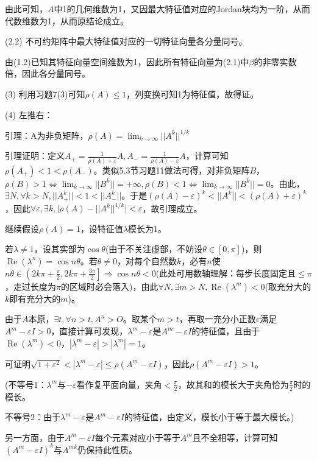\documentclass[a4paper,UTF8,fontset=windows]{ctexart}
\DeclareMathOperator{\re}{Re}
\begin{document}
\begin{enumerate}
由此可知，$A$中1的几何维数为1，又因最大特征值对应的Jordan块均为一阶，从而代数维数为1，从而原结论成立。

(2.2) 不可约矩阵中最大特征值对应的一切特征向量各分量同号。

由(1.2)已知其特征向量空间维数为1，因此所有特征向量为(2.1)中$\beta$的非零实数倍，因此各分量同号。

(3) 利用习题7(3)可知$\rho(A)\le1$，列变换可知1为特征值，故得证。

(4) 左推右：

引理：A为非负矩阵，$\rho(A)=\lim_{k\to\infty}{||A^k||^{1/k}}$

引理证明：定义$A_+=\frac{1}{\rho(A)+\varepsilon}A,A_-=\frac{1}{\rho(A)-\varepsilon}A$，计算可知$\rho(A_+)<1<\rho(A_-)$。类似5.3节习题11做法可得，对非负矩阵$B$，$\rho(B)>1\Leftrightarrow\lim_{k\to\infty}||B^k||=+\infty,\rho(B)<1\Leftrightarrow\lim_{k\to\infty}||B^k||=0$。由此，$\exists N,\forall k>N,||A_+^k||<1<||A_-^k||$。于是$(\rho(A)-\varepsilon)^k<||A^k||<(\rho(A)+\varepsilon)^k$，因此$\forall\varepsilon,\exists k,\big|\rho(A)-||A^k||^{1/k}\big|<\varepsilon$，故引理成立。

继续假设$\rho(A)=1$，设特征值$\lambda$模长为1。

若$\lambda\ne1$，设其实部为$\cos{\theta}$(由于不关注虚部，不妨设$\theta\in[0,\pi]$)，则$\re(\lambda^n)=\cos{n\theta}$。若$\theta\ne0$，对每个自然数$k$，必有$n$使$n\theta\in\left(2k\pi+\frac{\pi}{2},2k\pi+\frac{3\pi}{2}\right]\Rightarrow\cos{n\theta}<0$(此处可用数轴理解：每步长度固定且$\le\pi$，走过长度为$\pi$的区域时必会落入)，由此$\forall N,\exists m>N,\re(\lambda^m)<0$(取充分大的$k$即有充分大的$m$)。

由于$A$本原，$\exists t,\forall n>t,A^n>O$。取某个$m>t$，再取一充分小正数$\varepsilon$满足$A^m-\varepsilon I>0$，直接计算可发现，$\lambda^m-\varepsilon$是$A^m-\varepsilon I$的特征值，且由于$\re(\lambda^m)<0$，$|\lambda^m-\varepsilon|>|\lambda^m|=1$。

可证明$\sqrt{1+\varepsilon^2}<|\lambda^m-\varepsilon|\le\rho(A^m-\varepsilon I)$，因此$\rho(A^m-\varepsilon I)>1$。

(不等号1：$\lambda^m$与$-\varepsilon$看作复平面向量，夹角$<\frac{\pi}{2}$，故其和的模长大于夹角恰为$\frac{\pi}{2}$时的模长。

不等号2：由于$\lambda^m-\varepsilon$是$A^m-\varepsilon I$的特征值，由定义，模长小于等于最大模长。)

另一方面，由于$A^m-\varepsilon I$每个元素对应小于等于$A^m$且不全相等，计算可知$(A^m-\varepsilon I)^k$与$A^{mk}$仍保持此性质。


\end{enumerate}
\end{document}
